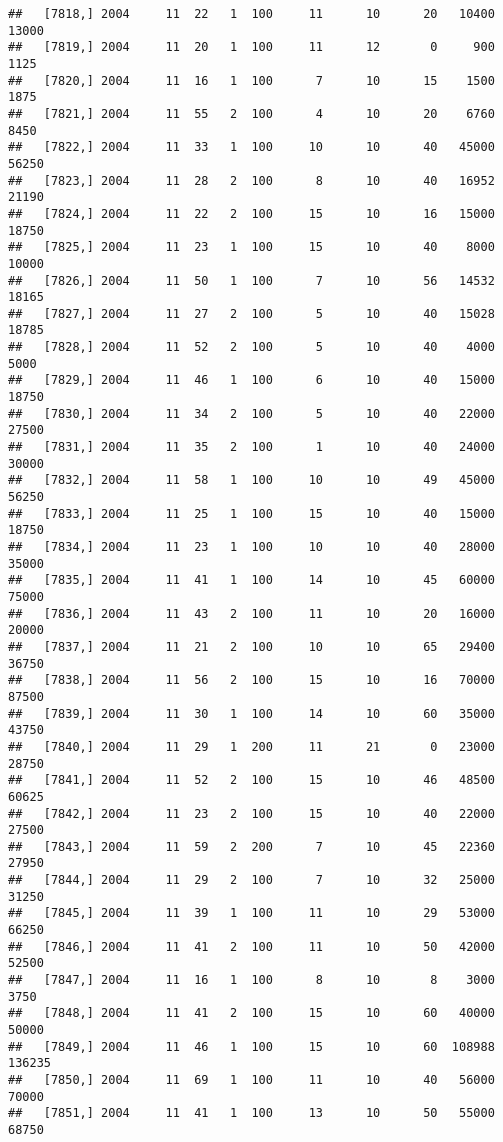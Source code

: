 \documentclass{article}\usepackage[]{graphicx}\usepackage[]{color}
\makeatletter
\newenvironment{kframe}{%
 \def\at@end@of@kframe{}%
 \ifinner\ifhmode%
  \def\at@end@of@kframe{\end{minipage}}%
  \begin{minipage}{\columnwidth}%
 \fi\fi%
 \def\FrameCommand##1{\hskip\@totalleftmargin \hskip-\fboxsep
 \colorbox{shadecolor}{##1}\hskip-\fboxsep
     \hskip-\linewidth \hskip-\@totalleftmargin \hskip\columnwidth}%
 \MakeFramed {\advance\hsize-\width
   \@totalleftmargin\z@ \linewidth\hsize
   \@setminipage}}%
 {\par\unskip\endMakeFramed%
 \at@end@of@kframe}
\newenvironment{knitrout}{}{} %
\makeatother
\begin{document}
\begin{knitrout}
\begin{kframe}
\begin{verbatim}
##   [7818,] 2004     11  22   1  100     11      10      20   10400   13000
##   [7819,] 2004     11  20   1  100     11      12       0     900    1125
##   [7820,] 2004     11  16   1  100      7      10      15    1500    1875
##   [7821,] 2004     11  55   2  100      4      10      20    6760    8450
##   [7822,] 2004     11  33   1  100     10      10      40   45000   56250
##   [7823,] 2004     11  28   2  100      8      10      40   16952   21190
##   [7824,] 2004     11  22   2  100     15      10      16   15000   18750
##   [7825,] 2004     11  23   1  100     15      10      40    8000   10000
##   [7826,] 2004     11  50   1  100      7      10      56   14532   18165
##   [7827,] 2004     11  27   2  100      5      10      40   15028   18785
##   [7828,] 2004     11  52   2  100      5      10      40    4000    5000
##   [7829,] 2004     11  46   1  100      6      10      40   15000   18750
##   [7830,] 2004     11  34   2  100      5      10      40   22000   27500
##   [7831,] 2004     11  35   2  100      1      10      40   24000   30000
##   [7832,] 2004     11  58   1  100     10      10      49   45000   56250
##   [7833,] 2004     11  25   1  100     15      10      40   15000   18750
##   [7834,] 2004     11  23   1  100     10      10      40   28000   35000
##   [7835,] 2004     11  41   1  100     14      10      45   60000   75000
##   [7836,] 2004     11  43   2  100     11      10      20   16000   20000
##   [7837,] 2004     11  21   2  100     10      10      65   29400   36750
##   [7838,] 2004     11  56   2  100     15      10      16   70000   87500
##   [7839,] 2004     11  30   1  100     14      10      60   35000   43750
##   [7840,] 2004     11  29   1  200     11      21       0   23000   28750
##   [7841,] 2004     11  52   2  100     15      10      46   48500   60625
##   [7842,] 2004     11  23   2  100     15      10      40   22000   27500
##   [7843,] 2004     11  59   2  200      7      10      45   22360   27950
##   [7844,] 2004     11  29   2  100      7      10      32   25000   31250
##   [7845,] 2004     11  39   1  100     11      10      29   53000   66250
##   [7846,] 2004     11  41   2  100     11      10      50   42000   52500
##   [7847,] 2004     11  16   1  100      8      10       8    3000    3750
##   [7848,] 2004     11  41   2  100     15      10      60   40000   50000
##   [7849,] 2004     11  46   1  100     15      10      60  108988  136235
##   [7850,] 2004     11  69   1  100     11      10      40   56000   70000
##   [7851,] 2004     11  41   1  100     13      10      50   55000   68750

\end{verbatim}
\end{kframe}
\end{knitrout}
\end{document}
